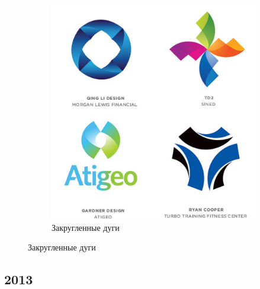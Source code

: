 \begin{figure}[h!]
  \vfill

  \centering
  \begin{subfigure}{.45\textwidth}
    \centering
    \includegraphics[width=\linewidth]{images/supplement/logolounge/2012/Zakruxhennie-dugi.jpeg}
    \caption[]{Закругленные дуги}
    \label{fig:logolounge:2012:zakruxhennie-dugi}
  \end{subfigure}
\end{figure}


\FloatBarrier
\subsection{2013}

